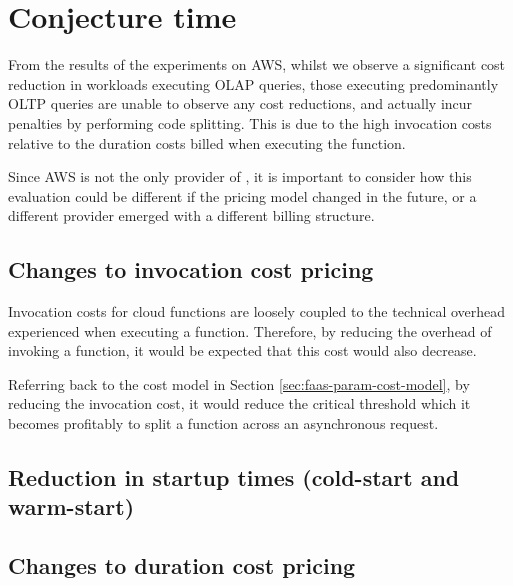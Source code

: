 %        

\section{Conjecture time}
From the results of the experiments on AWS, whilst we observe a significant cost reduction in workloads executing OLAP queries, those executing predominantly OLTP queries are unable to observe any cost reductions, and actually incur penalties by performing code splitting. This is due to the high invocation costs relative to the duration costs billed when executing the function.

Since AWS is not the only provider of \faas{}, it is important to consider how this evaluation could be different if the pricing model changed in the future, or a different provider emerged with a different billing structure.

\subsection{Changes to invocation cost pricing}
Invocation costs for cloud functions are loosely coupled to the technical overhead experienced when executing a \faas{} function. Therefore, by reducing the overhead of invoking a function, it would be expected that this cost would also decrease.

Referring back to the cost model in Section \ref{sec:faas-param-cost-model}, by reducing the invocation cost, it would reduce the critical threshold which it becomes profitably to split a function across an asynchronous request.

\subsection{Reduction in startup times (cold-start and warm-start)}

\subsection{Changes to duration cost pricing}

